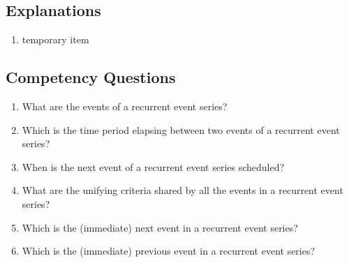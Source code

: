 \subsection{Explanations}
\label{exp:recurrentevent}
\begin{enumerate}
\item temporary item
\end{enumerate}

\subsection{Competency Questions}
\label{cqs:recurrentevent}
\begin{enumerate}[CQ1.]
    \item What are the events of a recurrent event series?
    \item Which is the time period elapsing between two events of a recurrent event series?
    \item When is the next event of a recurrent event series scheduled?
    \item What are the unifying criteria shared by all the events in a recurrent event series?
    \item Which is the (immediate) next event in a recurrent event series?
    \item Which is the (immediate) previous event in a recurrent event series?
\end{enumerate}

\newpage

